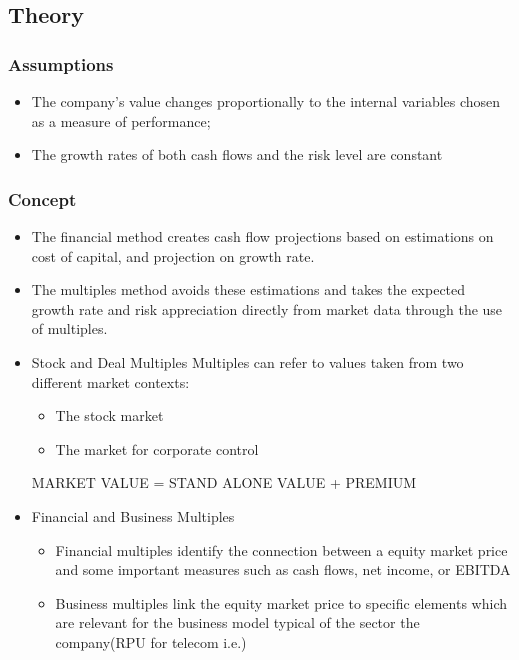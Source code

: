 \documentclass[11pt]{article}
\begin{document}
\subsection*{Theory}
\label{sec:orge957a14}
\subsubsection*{Assumptions}
\label{sec:orgac09111}
\begin{itemize}
\item The company’s value changes proportionally to the internal variables chosen as a measure of performance;
\label{sec:org31f75ad}
\item The growth rates of both cash flows and the risk level are constant
\label{sec:org96036fb}
\end{itemize}
\subsubsection*{Concept}
\label{sec:orgf9897e9}
\begin{itemize}
\item The financial method creates cash flow projections based on estimations on cost of capital, and projection on growth rate.\\
\item The multiples method avoids these estimations and takes the expected growth rate and risk appreciation directly from market data through the use of multiples.\\
\end{itemize}
\begin{itemize}
\item Stock and Deal Multiples
\label{sec:org106cc81}
Multiples can refer to values taken from two different market contexts:\\
\begin{itemize}
\item The stock market\\
\item The market for corporate control\\
\end{itemize}
MARKET VALUE = STAND ALONE VALUE + PREMIUM\\
\item Financial and Business Multiples
\label{sec:org35d1840}
\begin{itemize}
\item Financial multiples identify the connection between a equity market price and some important measures such as cash flows, net income, or EBITDA
\label{sec:orgbd90959}
\item Business multiples link the equity market price to specific elements which are relevant for the business model typical of the sector the company(RPU for telecom i.e.)
\label{sec:org13d5c7f}
\end{itemize}
\end{itemize}
\end{document}
